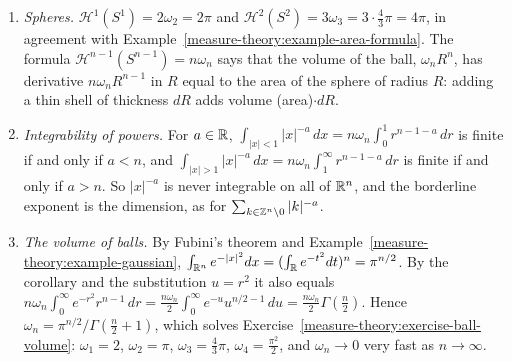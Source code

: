 \begin{example}\label{measure-theory:example-polar}
\begin{enumerate}
\item \emph{Spheres.} $\mathcal{H}^1(S^1) = 2\omega_2 = 2\pi$ and $\mathcal{H}^2(S^2) = 3\omega_3 = 3 \cdot \frac43\pi = 4\pi$, in agreement with Example~\ref{measure-theory:example-area-formula}. The
formula $\mathcal{H}^{n-1}(S^{n-1}) = n\omega_n$ says that the volume of the ball, $\omega_nR^n$, has derivative $n\omega_nR^{n-1}$ in $R$ equal to the area of the sphere of radius $R$: adding a thin shell of
thickness $dR$ adds volume (area)$\cdot dR$.
\item \emph{Integrability of powers.} For $a \in \mathbb{R}$, $\int_{|x| < 1}|x|^{-a}\,dx = n\omega_n\int_0^1r^{n-1-a}\,dr$ is finite if and only if $a < n$, and $\int_{|x| > 1}|x|^{-a}\,dx = n\omega_n\int_1^\infty r^{n-1-a}\,dr$
is finite if and only if $a > n$. So $|x|^{-a}$ is never integrable on all of $\mathbb{R}^n$, and the borderline exponent is the dimension, as for $\sum_{k \in \mathbb{Z}^n \setminus 0}|k|^{-a}$.
\item \emph{The volume of balls.} By Fubini's theorem and Example~\ref{measure-theory:example-gaussian}, $\int_{\mathbb{R}^n}e^{-|x|^2}dx = (\int_{\mathbb{R}} e^{-t^2}dt)^n = \pi^{n/2}$. By the corollary and the
substitution $u = r^2$ it also equals $n\omega_n\int_0^\infty e^{-r^2}r^{n-1}\,dr = \frac{n\omega_n}2\int_0^\infty e^{-u}u^{n/2 - 1}\,du = \frac{n\omega_n}2\Gamma(\frac n2)$. Hence
$\omega_n = \pi^{n/2}/\Gamma(\frac n2 + 1)$, which solves Exercise~\ref{measure-theory:exercise-ball-volume}: $\omega_1 = 2$, $\omega_2 = \pi$, $\omega_3 = \frac43\pi$, $\omega_4 = \frac{\pi^2}{2}$, and
$\omega_n \to 0$ very fast as $n \to \infty$.
\end{enumerate}
\end{example}


